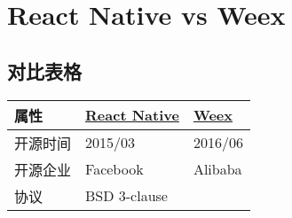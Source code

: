\section{React Native vs Weex}\label{react-native-vs-weex}

\subsection{对比表格}\label{ux5bf9ux6bd4ux8868ux683c}

\begin{longtable}[]{@{}lll@{}}
\toprule
\begin{minipage}[b]{0.30\columnwidth}\raggedright\strut
属性\strut
\end{minipage} & \begin{minipage}[b]{0.30\columnwidth}\raggedright\strut
\href{https://github.com/facebook/react-native}{React Native}\strut
\end{minipage} & \begin{minipage}[b]{0.30\columnwidth}\raggedright\strut
\href{https://github.com/apache/incubator-weex/}{Weex}\strut
\end{minipage}\tabularnewline
\midrule
\endhead
\begin{minipage}[t]{0.30\columnwidth}\raggedright\strut
开源时间\strut
\end{minipage} & \begin{minipage}[t]{0.30\columnwidth}\raggedright\strut
2015/03\strut
\end{minipage} & \begin{minipage}[t]{0.30\columnwidth}\raggedright\strut
2016/06\strut
\end{minipage}\tabularnewline
\begin{minipage}[t]{0.30\columnwidth}\raggedright\strut
开源企业\strut
\end{minipage} & \begin{minipage}[t]{0.30\columnwidth}\raggedright\strut
Facebook\strut
\end{minipage} & \begin{minipage}[t]{0.30\columnwidth}\raggedright\strut
Alibaba\strut
\end{minipage}\tabularnewline
\begin{minipage}[t]{0.30\columnwidth}\raggedright\strut
协议\strut
\end{minipage} & \begin{minipage}[t]{0.30\columnwidth}\raggedright\strut
BSD 3-clause\strut
\end{minipage} & \begin{minipage}[t]{0.30\columnwidth}\raggedright\strut

\end{minipage}
\end{longtable}
